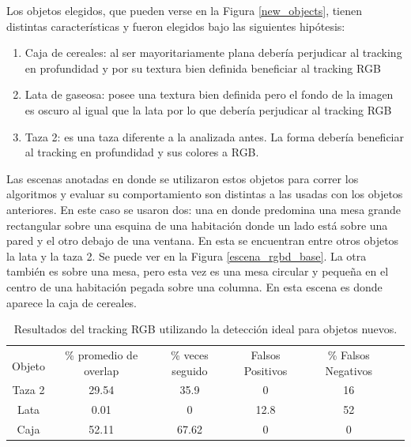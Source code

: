 Los objetos elegidos, que pueden verse en la Figura \ref{new_objects}, tienen distintas características y fueron elegidos bajo las siguientes hipótesis:
\begin{enumerate}
	\item Caja de cereales: al ser mayoritariamente plana debería perjudicar al tracking en profundidad y por su textura bien definida beneficiar al tracking RGB
	\item Lata de gaseosa: posee una textura bien definida pero el fondo de la imagen es oscuro al igual que la lata por lo que debería perjudicar al tracking RGB
	\item Taza 2: es una taza diferente a la analizada antes. La forma debería beneficiar al tracking en profundidad y sus colores a RGB.
\end{enumerate}

Las escenas anotadas en donde se utilizaron estos objetos para correr los algoritmos y evaluar su comportamiento son distintas a las usadas con los objetos anteriores. En este caso se usaron dos: una en donde predomina una mesa grande rectangular sobre una esquina de una habitación donde un lado está sobre una pared y el otro debajo de una ventana. En esta se encuentran entre otros objetos la lata y la taza 2. Se puede ver en la Figura \ref{escena_rgbd_base}. La otra también es sobre una mesa, pero esta vez es una mesa circular y pequeña en el centro de una habitación pegada sobre una columna. En esta escena es donde aparece la caja de cereales.


\begin{table}[h]
    \begin{tabular}{|c|c|c|c|c|c|}
    \hline
    & \multirow{2}{2.4cm}{\% promedio de overlap} & \multirow{2}{2cm}{\% veces seguido} & \multirow{2}{1.6cm}{Falsos Positivos} & \multirow{2}{1.6cm}{\% Falsos Negativos}\\
	Objeto & & & &\\
    \hline
    Taza 2  & 29.54      &  35.9     & 0        &  16 \\
    \hline
    Lata    &  0.01      &     0     & 12.8     &  52 \\
    \hline
    Caja    & 52.11      & 67.62     & 0        &   0 \\
    \hline
    \end{tabular}
\caption{Resultados del tracking RGB utilizando la detección ideal para objetos nuevos.}
\label{tabla_rgb_nuevos}
\end{table}


